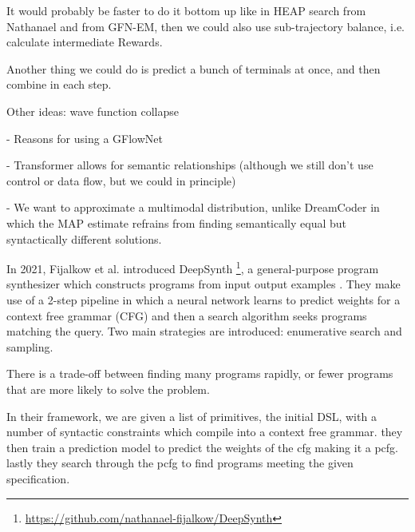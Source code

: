 It would probably be faster to do it bottom up like in HEAP search from Nathanael and from GFN-EM, then we could also use sub-trajectory balance, i.e. calculate intermediate Rewards. 

Another thing we could do is predict a bunch of terminals at once, and then combine in each step. 

Other ideas: wave function collapse



- Reasons for using a GFlowNet

- Transformer allows for semantic relationships (although we still don't use control or data flow, but we could in principle)

- We want to approximate a multimodal distribution, unlike DreamCoder in which the MAP estimate refrains from finding semantically equal but syntactically different solutions.






In 2021, Fijalkow et al. introduced DeepSynth \footnote{\url{https://github.com/nathanael-fijalkow/DeepSynth}}, a general-purpose program synthesizer which constructs programs from input output examples \cite{fijalkow_scaling_2021}. They make use of a 2-step pipeline in which a neural network learns to predict weights for a context free grammar (CFG) and then a search algorithm seeks programs matching the query. 
Two main strategies are introduced: enumerative search and sampling.

There is a trade-off between finding many programs rapidly, or fewer programs that are more likely to solve the problem.


In their framework, we are given a list of primitives, the initial DSL, with a number of syntactic constraints which compile into a context free grammar. they then train a prediction model to predict the weights of the cfg making it a pcfg. lastly they search through the pcfg to find programs meeting the given specification. 

